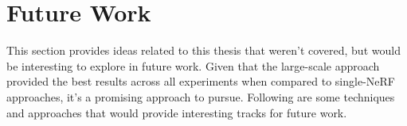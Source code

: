 \begin{comment}
Following the successful implementation of a dataparser for real-world data, we applied our pipeline to data captured from an actual vehicle. Despite operational functionality, the results from the real-world data proved less than optimal. The limitations identified during these experiments are considered crucial factors in explaining these outcomes. Consequently, future work will address these constraints to further refine the performance of the NeRF-based pipeline for real-world applications.

- Pipeline from CARLA to Nerfstudio
    - Enables experimenting with data capture techniques that can later be applied to real world scenarios.
    - Enables running multiple experiments with different experiment settings, e.g. camera setup, vehicle speed, route, image resolution, etc., in a streamlined way.
    - The data output from the experiment-pipeline in CARLA is in a format supported by most NeRFs. Enables training NeRFs on the synthetic data captured in CARLA, and, based on the evaluation of the NeRF, tweak settings to improve the resulting image synthesis.
- A baseline for NeRFs trained on synthetic data captured in CARLA. 
    - Can be used to further improve both the data capture and the NeRF-models on synthetic data.
    - Can be used to experiment with data capture- and NeRF-settings.
    - The metrics used to evaluate the baseline (PSNR, SSIM and LPIPS) are widely used throughout NeRF-research and makes comparable.
- Block-NeRF in Nerfstudio API
    - Creates a naive Block-NeRF implementation in the Nerfstudio API, demonstrating how such an approach can substantially increase the quality of large scene NeRFs.
    - The PoC allows testing which parameters are important when capturing large scale data for NeRFs. E.g. the segment size, overlap between the blocks, image merging techniques.
- Side-by-side view
    - Leverage FFMPEG to create a script for generating side-by-side views of the rendered NeRF and the ground truth.
    - Makes qualitative assessment of the resulting NeRF easier.
\end{comment}

















\section{Future Work}
This section provides ideas related to this thesis that weren't covered, but would be interesting to explore in future work. Given that the large-scale approach provided the best results across all experiments when compared to single-NeRF approaches, it's a promising approach to pursue. Following are some techniques and approaches that would provide interesting tracks for future work.

